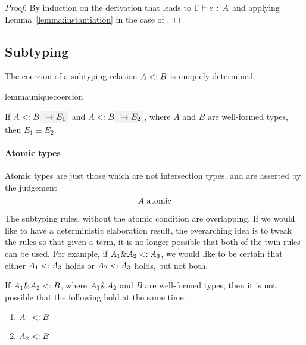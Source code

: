 \begin{proof}
  By induction on the derivation that leads to $\Gamma \vdash e \ \!:\! \ A$ and applying
  Lemma~\ref{lemma:instantiation} in the case of .
\end{proof}

\subsection{Subtyping}

The coercion of a subtyping relation $A <: B$ is uniquely determined.
\begin{restatable}{lemma}{uniquecoercion}
  \label{lemma:unique-coercion}

  If $A \subtype B \yields {E_1}$ and $A \subtype B \yields {E_2}$, where $A$
  and $B$ are well-formed types, then $E_1 \equiv E_2$.
\end{restatable}


\paragraph{Atomic types} Atomic types are just those which are not intersection
types, and are asserted by the judgement \[ A \ \textnormal{atomic} \]

The subtyping rules, without the atomic condition are overlapping. If we would
like to have a deterministic elaboration result, the overarching idea is to
tweak the rules so that given a term, it is no longer possible that both of the
twin rules can be used. For example, if $A_1 \& A_2 <: A_3$, we would
like to be certain that either $A_1 <: A_3$ holds or $A_2 <: A_3$
holds, but not both.

\begin{lemma}
  \label{lemma:unique-subtype-contributor}

  If $A_1 \& A_2 <: B$, where $A_1 \& A_2$ and $B$ are well-formed types,
  then it is not possible that the following hold at the same time:
  \begin{enumerate}
    \item $A_1 <: B$
    \item $A_2 <: B$
  \end{enumerate}
\end{lemma}

